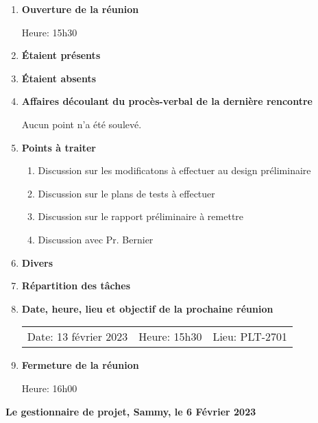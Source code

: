 \documentclass[12pt]{ULojpv}
\begin{document}
\entete
\begin{enumerate}

\item \textbf{Ouverture de la réunion}

Heure: 15h30

\item \textbf{Étaient présents}


\item \textbf{Étaient absents}

\item \textbf{Affaires découlant du procès-verbal de la dernière rencontre}

Aucun point n'a été soulevé.


\item \textbf{Points à traiter}
   \begin{enumerate}
      \item Discussion sur les modificatons à effectuer au design préliminaire
   
      \item Discussion sur le plans de tests à effectuer

      \item Discussion sur le rapport préliminaire à remettre
      
      
      \item Discussion avec Pr. Bernier
      
      
      
   \end{enumerate}

\item \textbf{Divers}

\item \textbf{Répartition des tâches}



\item \textbf{Date, heure, lieu et objectif de la prochaine réunion}

\begin{tabular}{@{}lll}
   Date: 13 février 2023 & 
   Heure: 15h30 & 
   Lieu: PLT-2701 \\
\end{tabular}
\par


\item \textbf{Fermeture de la réunion}

Heure: 16h00




\end{enumerate}

\begin{flushright}
   \textbf{Le gestionnaire de projet, Sammy, le 6 Février 2023}

\end{flushright}
\end{document}
